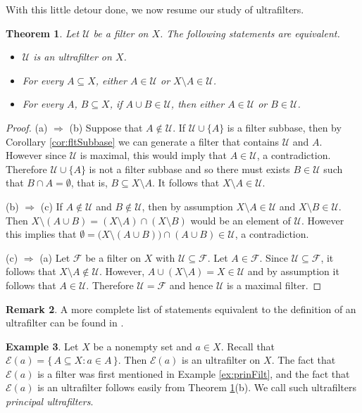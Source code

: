 \documentclass[12pt]{article}
\theoremstyle{plain}
\newtheorem{thm}{Theorem}[section]
\theoremstyle{definition}
\newtheorem{rmk}[thm]{Remark}
\newtheorem{example}[thm]{Example}
\newcommand{\calE}{\mathcal{E}}
\newcommand{\calF}{\mathcal{F}}
\newcommand{\calU}{\mathcal{U}}
\begin{document}
With this little detour done, we now resume our study of ultrafilters.

\begin{thm}
  \label{thm:equivUf}
  Let $\calU$ be a filter on $X$.
  The following statements are equivalent.
  \begin{itemize}
    \item[(a)] $\calU$ is an ultrafilter on $X$.
    \item[(b)] For every $A \subseteq X$, either $A \in \calU$ or $X \setminus A \in \calU$.
    \item[(c)] For every $A$, $B \subseteq X$, if $A \cup B \in \calU$, then either $A \in \calU$ or $B \in \calU$.
  \end{itemize}
\end{thm}
\begin{proof}
  (a) $\Rightarrow$ (b)
  Suppose that $A \not\in \calU$.
  If $\calU \cup \{A\}$ is a filter subbase, then by Corollary
  \ref{cor:fltSubbase} we can generate a filter that contains $\calU$
  and $A$.
  However since $\calU$ is maximal, this would imply that $A \in
  \calU$, a contradiction.
  Therefore $\calU \cup \{A\}$ is not a filter subbase and so there
  must exists $B \in \calU$ such that $B \cap A = \emptyset$, that is,
  $B \subseteq X \setminus A$.
  It follows that $X \setminus A \in \calU$.
  
  (b) $\Rightarrow$ (c)
  If $A \not\in \calU$ and $B \not\in \calU$, then by assumption $X
  \setminus A \in \calU$ and $X \setminus B \in \calU$.
  Then $X \setminus (A \cup B) = (X \setminus A) \cap (X \setminus B)$
  would be an element of $\calU$.
  However this implies that $\emptyset = \bigl(X \setminus (A \cup
  B)\bigr) \cap (A \cup B) \in \calU$, a contradiction.

  (c) $\Rightarrow$ (a)
  Let $\calF$ be a filter on $X$ with $\calU \subseteq \calF$.
  Let $A \in \calF$.
  Since $\calU \subseteq \calF$, it follows that $X \setminus A
  \not\in \calU$.
  However, $A \cup (X \setminus A) = X \in \calU$ and by assumption it
  follows that $A \in \calU$.
  Therefore $\calU = \calF$ and hence $\calU$ is a maximal filter.
\end{proof}
\begin{rmk}
  A more complete list of statements equivalent to the definition of an ultrafilter can be found in \cite[Theorem 3.6]{Hindman:1998fk}.
\end{rmk}

\begin{example}
  Let $X$ be a nonempty set and $a \in X$.
  Recall that $\calE(a) = \{\, A \subseteq X : a \in A \,\}$.
  Then $\calE(a)$ is an ultrafilter on $X$.
  The fact that $\calE(a)$ is a filter was first mentioned in Example  \ref{ex:prinFilt}, and the fact that $\calE(a)$ is an ultrafilter
  follows easily from Theorem \ref{thm:equivUf}(b).
  We call such ultrafilters \textsl{principal ultrafilters}.
\end{example}
\end{document}
